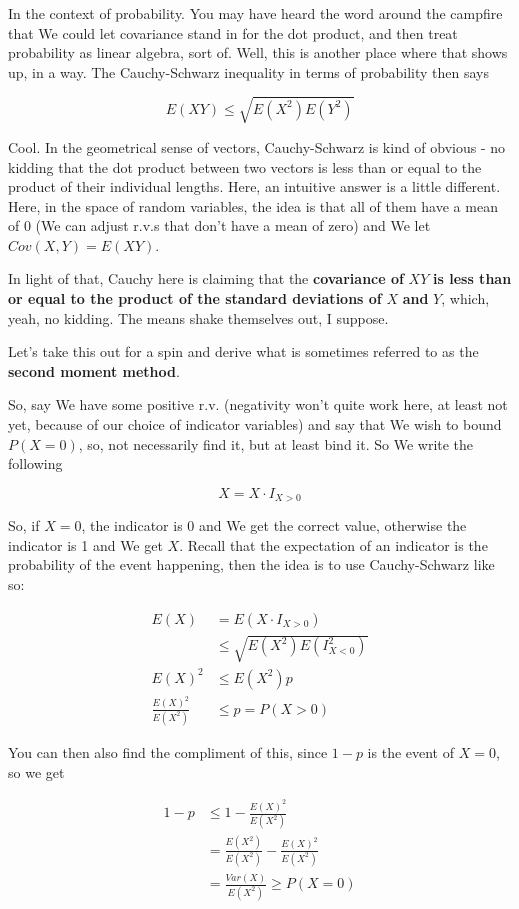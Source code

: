 \documentclass{article}
\begin{document}
		In the context of probability. You may have heard the word around the campfire that We could let covariance stand in for the dot product, and then treat probability as linear algebra, sort of. Well, this is another place where that shows up, in a way. The Cauchy-Schwarz inequality in terms of probability then says
		
		\[ E(XY)\le \sqrt{E(X^2)E(Y^2)} \]
		
		Cool. In the geometrical sense of vectors, Cauchy-Schwarz is kind of obvious - no kidding that the dot product between two vectors is less than or equal to the product of their individual lengths. Here, an intuitive answer is a little different. Here, in the space of random variables, the idea is that all of them have a mean of 0 (We can adjust r.v.s that don't have a mean of zero) and We let $Cov(X, Y) = E(XY)$.
		
		In light of that, Cauchy here is claiming that the \textbf{covariance of} $XY$ \textbf{is less than or equal to the product of the standard deviations of} $X$ \textbf{and} $Y$, which, yeah, no kidding. The means shake themselves out, I suppose.
		
		Let's take this out for a spin and derive what is sometimes referred to as the \textbf{second moment method}.
		
		So, say We have some positive r.v. (negativity won't quite work here, at least not yet, because of our choice of indicator variables) and say that We wish to bound $P(X=0)$, so, not necessarily find it, but at least bind it. So We write the following
		
		\[ X = X\cdot I_{X>0} \]
			
		So, if $X=0$, the indicator is 0 and We get the correct value, otherwise the indicator is 1 and We get $X$. Recall that the expectation of an indicator is the probability of the event happening, then the idea is to use Cauchy-Schwarz like so:
		
		\begin{align*}
		E(X) &= E(X\cdot I_{X>0})\\
		&\le \sqrt{E(X^2)E(I_{X<0}^2)}\\
		E(X)^2 &\le E(X^2)p\\
		\frac{E(X)^2}{E(X^2)} &\le p = P(X>0)
		\end{align*}
			
		You can then also find the compliment of this, since $1-p$ is the event of $X=0$, so we get
		
		\begin{align*}
		1-p &\le 1-\frac{E(X)^2}{E(X^2)}\\
		&= \frac{E(X^2)}{E(X^2)} - \frac{E(X)^2}{E(X^2)}\\
		&= \frac{Var(X)}{E(X^2)} \ge P(X=0)
		\end{align*}
			
\end{document}
